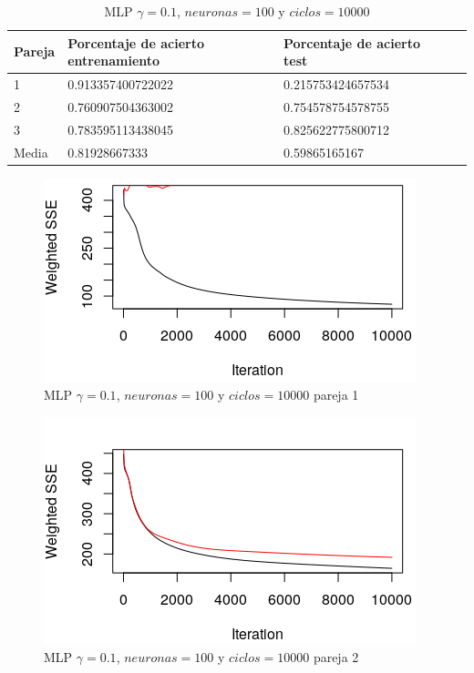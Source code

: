 \documentclass[11pt,spanish,listoffigures,listoftables]{workluis}
\begin{document}
\begin{table}[H]
\centering
\caption{MLP $\gamma = 0.1$, $neuronas = 100$ y $ciclos = 10000$}
\label{tb:tb1}
\begin{tabular}{lllll}
\hline
\multicolumn{1}{|l|}{Pareja} & Porcentaje de acierto entrenamiento & Porcentaje de acierto test  \\ \hline \hline
1                            & 0.913357400722022    & 0.215753424657534 \\
2                            & 0.760907504363002    & 0.754578754578755 \\
3                            & 0.783595113438045    & 0.825622775800712 \\
Media                        & 0.81928667333        & 0.59865165167     \\ \hline
\end{tabular}
\end{table}

\begin{figure}[H]
\centering
\includegraphics[scale=5]{011001}
\caption{MLP $\gamma = 0.1$, $neuronas = 100$ y $ciclos = 10000$ pareja 1}
\end{figure} 

\begin{figure}[H]
\centering
\includegraphics[scale=5]{011002}
\caption{MLP $\gamma = 0.1$, $neuronas = 100$ y $ciclos = 10000$ pareja 2}
\end{figure} 
\end{document}
